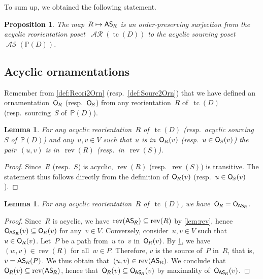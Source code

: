 \documentclass{amsart}
\newtheorem{proposition}[theorem]{Proposition}
\newtheorem{lemma}[theorem]{Lemma}
\theoremstyle{definition}
\renewcommand{\c}[1]{\mathcal{#1}} %
\DeclareMathOperator{\tc}{tc} %
\newcommand{\vincent}[1]{\todo[size=\tiny,color=blue!30]{ #1 \\ \hfill --- V.}\,}
\newcommand{\mymap}[2]{\mathsf{#1}_{\hspace{-.7pt}#2}}
\newcommand{\orn}[1]{\mymap{O}{#1}}  %
\newcommand{\reori}[1]{\mymap{R}{#1}}  %
\DeclareMathOperator{\AReori}{\c{AR}}  %
\DeclareMathOperator{\rev}{rev} %
\newcommand{\sour}[1]{\mymap{S}{#1}}  %
\DeclareMathOperator{\ASour}{\mathcal{AS}}  %
\newcommand{\asour}[1]{\mymap{AS}{#1}}  %
\newcommand{\PP}{\mathbb P} %
\begin{document}
To sum up, we obtained the following statement.

\begin{proposition}
The map~$R \mapsto \asour{R}$ is an order-preserving surjection from the acyclic reorientation poset~$\AReori(\tc(D))$ to the acyclic sourcing poset~$\ASour(\PP(D))$.
\end{proposition}

\subsection{Acyclic ornamentations}

Remember from \cref{def:Reori2Orn} (resp.~\cref{def:Sourc2Orn}) that we have defined an ornamentation~$\orn{R}$ (resp.~$\orn{S}$) from any reorientation~$R$ of~$\tc(D)$ (resp.~sourcing~$S$ of~$\PP(D)$).


\begin{lemma}
\label{lem:acyclicSimplifiesDef}
For any acyclic reorientation~$R$ of~$\tc(D)$ (resp.~acyclic sourcing~$S$ of~$\PP(D)$) and any~$u,v \in V$ such that~$u$ is in~$\orn{R}(v)$ (resp.~$u \in \orn{S}(v)$) the pair~$(u,v)$ is in~$\rev(R)$ (resp.~in~$\rev(S)$).
\end{lemma}

\begin{proof}
Since~$R$ (resp.~$S$) is acyclic, $\rev(R)$ (resp.~$\rev(S)$) is transitive.
The statement thus follows directly from the definition of~$\orn{R}(v)$ (resp.~$u \in \orn{S}(v)$).
\end{proof}

\begin{lemma}
\label{lem:AOrn1}
For any acyclic reorientation~$R$ of~$\tc(D)$, we have~$\orn{R} = \orn{\asour{R}}$.
\end{lemma}

\begin{proof}
Since~$R$ is acyclic, we have~$\rev(\asour{R}) \subseteq \rev(R)$ by \cref{lem:rev}, hence~$\orn{\asour{R}}(v) \subseteq \orn{R}(v)$ for any~$v \in V$.
Conversely, consider~$u,v \in V$ such that~$u \in \orn{R}(v)$.
Let~$P$ be a path from~$u$ to~$v$ in~$\orn{R}(v)$.
By \cref{lem:acyclicSimplifiesDef}, we have~$(w,v) \in \rev(R)$ for all~$w \in P$.
Therefore, $v$ is the source of~$P$ in~$R$, that is, $v = \asour{R}(P)$.
We thus obtain that~$(u,v) \in \rev(\asour{R})$.
We conclude that~$\orn{R}(v) \subseteq \rev(\asour{R})$, hence that~$\orn{R}(v) \subseteq \orn{\asour{R}}(v)$ by maximality of~$\orn{\asour{R}}(v)$.
\end{proof}
\end{document}

